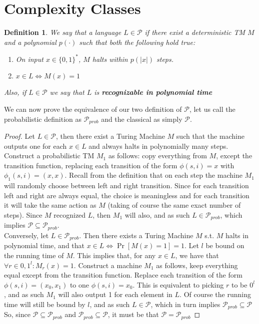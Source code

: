 \documentclass{article}
\newtheorem{definition}{Definition}
\begin{document}
\section{Complexity Classes}
\begin{definition}
We say that a language $L \in \mathcal{P}$ if there exist a deterministic TM $M$ and a polynomial $p(\cdot)$ such that both the following hold true:
\begin{enumerate}
    \item On input $x \in \{0, 1\}^*$, $M$ halts within $p(|x|)$ steps.
    \item $x \in L \iff M(x) = 1$
\end{enumerate}
Also, if $L \in \mathcal{P}$ we say that $L$ is \textbf{recognizable in polynomial time}
\end{definition}

We can now prove the equivalence of our two definition of $\mathcal{P}$, let us call the probabilistic definition as $\mathcal{P}_{prob}$ and the classical as simply $\mathcal{P}$.

\begin{proof}
Let $L \in \mathcal{P}$, then there exist a Turing Machine $M$ such that the machine outputs one for each $x \in L$ and always halts in polynomially many steps. Construct a probabilistic TM $M_1$ as follows: copy everything from $M$, except the transition function, replacing each transition of the form $\phi(s, i) = x$ with $\phi_1(s, i) = (x, x)$. Recall from the definition that on each step the machine $M_1$ will randomly choose between left and right transition. Since for each transition left and right are always equal, the choice is meaningless and for each transition it will take the same action as $M$ (taking of course the same exact number of steps). Since $M$ recognized $L$, then $M_1$ will also, and as such $L \in \mathcal{P}_{prob}$, which implies $\mathcal{P} \subseteq \mathcal{P}_{prob}$. \\

Conversely, let $L \in \mathcal{P}_{prob}$. Then there exists a Turing Machine $M$ s.t. $M$ halts in polynomial time, and that $ x \in L \iff \Pr[M(x) = 1] = 1$. Let $l$ be bound on the running time of $M$. This implies that, for any $x \in L$, we have that $\forall r \in {0,1}^l : M_r(x) = 1$. Construct a machine $M_1$ as follows, keep everything equal except from the transition function. Replace each transition of the form $\phi(s, i) = (x_0, x_1)$ to one $\phi(s, i) = x_0$. This is equivalent to picking $r$ to be $0^l$, and as such $M_1$ will also output 1 for each element in $L$. Of course the running time will still be bound by $l$, and as such $L \in \mathcal{P}$, which in turn implies $\mathcal{P}_{prob} \subseteq \mathcal{P}$ \\

So, since $\mathcal{P} \subseteq \mathcal{P}_{prob}$ and $\mathcal{P}_{prob} \subseteq \mathcal{P}$, it must be that $\mathcal{P} = \mathcal{P}_{prob}$
\end{proof}
\end{document}
